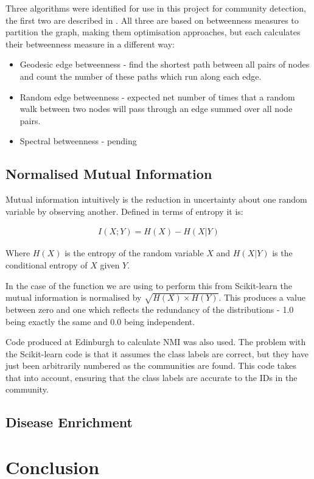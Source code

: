 Three algorithms were identified for use in this project for community detection, the first two are described in \textcite{newman_finding_2004}.
All three are based on betweenness measures to partition the graph, making them optimisation approaches, but each calculates their betweenness measure in a different way:

\begin{itemize}
    \item Geodesic edge betweenness - find the shortest path between all pairs of nodes and count the number of these paths which run along each edge.
    \item Random edge betweenness - expected net number of times that a random walk between two nodes will pass through an edge summed over all node pairs.
    \item Spectral betweenness - pending
\end{itemize}


\subsection{Normalised Mutual Information}

Mutual information intuitively is the reduction in uncertainty about one random variable by observing another.
Defined in terms of entropy it is\autocite{mackay_information_2003}:

\begin{align}
    I(X;Y) = H(X) - H(X|Y)
\end{align}

Where $H(X)$ is the entropy of the random variable $X$ and $H(X|Y)$ is the conditional entropy of $X$ given $Y$.

In the case of the function we are using to perform this from Scikit-learn the mutual information is normalised by $\sqrt{H(X)\times H(Y)}$\autocite{pedregosa_scikit-learn:_2011}.
This produces a value between zero and one which reflects the redundancy of the distributions - 1.0 being exactly the same and 0.0 being independent.

Code produced at Edinburgh to calculate NMI was also used.
The problem with the Scikit-learn code is that it assumes the class labels are correct, but they have just been arbitrarily numbered as the communities are found. 
This code takes that into account, ensuring that the class labels are accurate to the IDs in the community.

\subsection{Disease Enrichment}





\section*{Conclusion}


